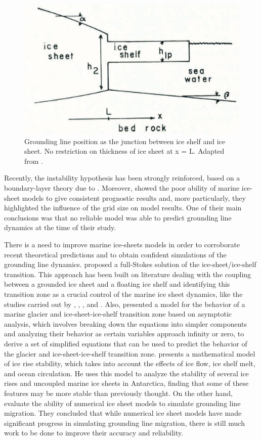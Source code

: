 \documentclass{article}
\begin{document}
\begin{figure}[!h]
	\centering
	\includegraphics[width=0.7\linewidth]{../fig/H2.png}
	\caption{Grounding line position as the junction between ice shelf and ice sheet. No restriction on thickness of ice sheet at x = L. Adapted from \cite{weertman1974stability}.}
	\label{Instability_condition}
\end{figure}

Recently, the instability hypothesis has been strongly reinforced, based on a boundary-layer theory due to \cite{schoof2007ice}. Moreover, \cite{vieli2005assessing} showed the poor ability of marine ice-sheet models to give consistent prognostic results and, more particularly, they highlighted the influence of the grid size on model results. One of their main conclusions was that no reliable model was able to predict grounding line dynamics at the time of their study.

There is a need to improve marine ice-sheets models in order to corroborate recent theoretical predictions and to obtain confident simulations of the grounding line dynamics. \cite{durand2009marine} proposed a full-Stokes solution of the ice-sheet/ice-shelf transition. This approach has been built on literature dealing with the coupling between a grounded ice sheet and a floating ice shelf and identifying this transition zone as a crucial control of the marine ice sheet dynamics, like the studies carried out by \cite{weertman1974stability}, \cite{van1985response}, \cite{schoof2007ice}, and \cite{schoof2007marine}. Also, \cite{chugunov1996modelling} presented a model for the behavior of a marine glacier and ice-sheet-ice-shelf transition zone based on asymptotic analysis, which involves breaking down the equations into simpler components and analyzing their behavior as certain variables approach infinity or zero, to derive a set of simplified equations that can be used to predict the behavior of the glacier and ice-sheet-ice-shelf transition zone. \cite{hindmarsh1996stability} presents a mathematical model of ice rise stability, which takes into account the effects of ice flow, ice shelf melt, and ocean circulation. He uses this model to analyze the stability of several ice rises and uncoupled marine ice sheets in Antarctica, finding that some of these features may be more stable than previously thought. On the other hand, \cite{vieli2005assessing} evaluate the ability of numerical ice sheet models to simulate grounding line migration. They concluded that while numerical ice sheet models have made significant progress in simulating grounding line migration, there is still much work to be done to improve their accuracy and reliability.
\end{document}
